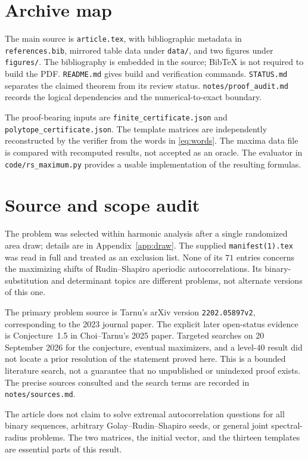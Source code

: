 \documentclass[11pt,a4paper]{article}
\theoremstyle{definition}\newtheorem{definition}[theorem]{Definition}
\theoremstyle{remark}\newtheorem{remark}[theorem]{Remark}
\begin{document}
\section{Archive map}
The main source is \texttt{article.tex}, with bibliographic metadata in
\texttt{references.bib}, mirrored table data under \texttt{data/}, and two
figures under \texttt{figures/}. The bibliography is embedded in the source;
BibTeX is not required to build the PDF.
\texttt{README.md} gives build and verification commands.
\texttt{STATUS.md} separates the claimed theorem from its review status.
\texttt{notes/proof\_audit.md} records the logical dependencies and the
numerical-to-exact boundary.

The proof-bearing inputs are
\texttt{finite\_certificate.json} and
\texttt{polytope\_certificate.json}. The template matrices are independently
reconstructed by the verifier from the words in \eqref{eq:words}.
The maxima data file is compared with recomputed results, not accepted as an
oracle. The evaluator in \texttt{code/rs\_maximum.py} provides a usable
implementation of the resulting formulas.

\section{Source and scope audit}
\label{sec:sources}

The problem was selected within harmonic analysis after a single randomized
area draw; details are in Appendix~\ref{app:draw}. The supplied
\texttt{manifest(1).tex} was read in full and treated as an exclusion list.
None of its $71$ entries concerns the maximizing shifts of Rudin--Shapiro
aperiodic autocorrelations. Its binary-substitution and determinant topics are
different problems, not alternate versions of this one.

The primary problem source is Tarnu's arXiv version
\texttt{2202.05897v2}, corresponding to the 2023 journal paper. The explicit
later open-status evidence is Conjecture~1.5 in Choi--Tarnu's 2025 paper.
Targeted searches on 20 September 2026 for the conjecture, eventual
maximizers, and a level-$40$ result did not locate a prior resolution of the
statement proved here. This is a bounded literature search, not a guarantee
that no unpublished or unindexed proof exists. The precise sources consulted
and the search terms are recorded in \texttt{notes/sources.md}.

The article does not claim to solve extremal autocorrelation questions for
all binary sequences, arbitrary Golay--Rudin--Shapiro seeds, or general joint
spectral-radius problems. The two matrices, the initial vector, and the
thirteen templates are essential parts of this result.
\end{document}
